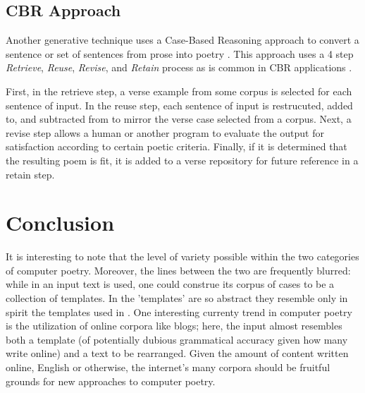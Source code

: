 \documentclass[10pt]{article}
\begin{document}
\subsection{CBR Approach}
Another generative technique uses a Case-Based Reasoning approach to convert a
sentence or set of sentences from prose into poetry \cite{Gervas01}. This
approach uses a 4 step \emph{Retrieve}, \emph{Reuse}, \emph{Revise}, and
\emph{Retain} process as is common in CBR applications \cite{Wong08}. 

First, in the retrieve step, a verse example from some corpus is selected for
each sentence of input. In the reuse step, each sentence of input is
restrucuted, added to, and subtracted from to mirror the verse case selected
from a corpus.  Next, a revise step allows a human or another program to
evaluate the output for satisfaction according to certain poetic criteria.
Finally, if it is determined that the resulting poem is fit, it is added to a
verse repository for future reference in a retain step.


\section{Conclusion}
It is interesting to note that the level of variety possible within the two
categories of computer poetry. Moreover, the lines between the two are
frequently blurred: while in \cite{Gervas01} an input text is used, one could
construe its corpus of cases to be a collection of templates. In
\cite{Manurung03} the 'templates' are so abstract they resemble only in spirit
the templates used in \cite{Chamb84}. One interesting currenty trend in
computer poetry is the utilization of online corpora like blogs; here, the
input almost resembles both a template (of potentially dubious grammatical
accuracy given how many write online) and a text to be rearranged. Given the
amount of content written online, English or otherwise, the internet's many
corpora should be fruitful grounds for new approaches to computer poetry.



\end{document}
